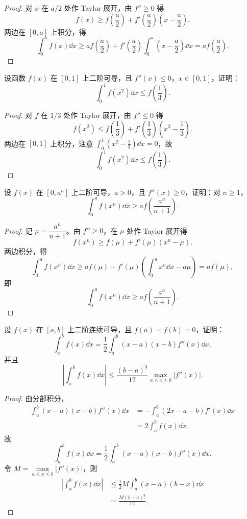 \begin{proof}
	对 $x$ 在 $a/2$ 处作 Taylor 展开，由 $f''\geqslant0$ 得
	\[
	f(x)\geqslant f\left(\frac a2\right)+f'\left(\frac a2\right)\left(x-\frac a2\right).
	\]
	两边在 $[0,a]$ 上积分，得
	\[
	\int_0^a f(x)\dd x
	\geqslant a f\left(\frac a2\right)+f'\left(\frac a2\right)\int_0^a\left(x-\frac a2\right)\dd x
	=a f\left(\frac a2\right).
	\]
\end{proof}

\begin{problem}
	设函数 $f(x)$ 在 $[0,1]$ 上二阶可导，且 $f''(x)\leqslant0$，$x\in[0,1]$，证明：
	\[
	\int_0^1 f(x^2)\dd x\leqslant f\left(\frac13\right).
	\]
\end{problem}

\begin{proof}
	对 $f$ 在 $1/3$ 处作 Taylor 展开，由 $f''\leqslant0$ 得
	\[
	f(x^2)\leqslant f\left(\frac13\right)+f'\left(\frac13\right)\left(x^2-\frac13\right).
	\]
	两边在 $[0,1]$ 上积分，注意 $\displaystyle\int_0^1\left(x^2-\frac13\right)\dd x=0$，故
	\[
	\int_0^1 f(x^2)\dd x\leqslant f\left(\frac13\right).
	\]
\end{proof}

\begin{problem}
	设 $f(x)$ 在 $[0,a^n]$ 上二阶可导，$a>0$，且 $f''(x)\geqslant0$，证明：对 $n\geqslant1$，
	\[
	\int_0^a f(x^n)\dd x\geqslant a f\left(\frac{a^n}{n+1}\right).
	\]
\end{problem}

\begin{proof}
	记 $\mu=\dfrac{a^n}{n+1}$。由 $f''\geqslant0$，在 $\mu$ 处作 Taylor 展开得
	\[
	f(x^n)\geqslant f(\mu)+f'(\mu)(x^n-\mu).
	\]
	两边积分，得
	\[
	\int_0^a f(x^n)\dd x
	\geqslant af(\mu)+f'(\mu)\left(\int_0^a x^n\dd x-a\mu\right)
	=af(\mu),
	\]
	即
	\[
	\int_0^a f(x^n)\dd x\geqslant a f\left(\frac{a^n}{n+1}\right).
	\]
\end{proof}

\begin{problem}
	设 $f(x)$ 在 $[a,b]$ 上二阶连续可导，且 $f(a)=f(b)=0$，证明：
	\[
	\int_a^b f(x)\dd x=\frac12\int_a^b (x-a)(x-b)f''(x)\dd x,
	\]
	并且
	\[
	\left|\int_a^b f(x)\dd x\right|
	\leqslant \frac{(b-a)^3}{12}\max_{a\leqslant x\leqslant b}|f''(x)|.
	\]
\end{problem}

\begin{proof}
	由分部积分，
	\[
	\begin{aligned}
		\int_a^b (x-a)(x-b)f''(x)\dd x
		&=-\int_a^b (2x-a-b)f'(x)\dd x\\
		&=2\int_a^b f(x)\dd x.
	\end{aligned}
	\]
	故
	\[
	\int_a^b f(x)\dd x=\frac12\int_a^b (x-a)(x-b)f''(x)\dd x.
	\]
	令 $M=\max\limits_{a\leqslant x\leqslant b}|f''(x)|$，则
	\[
	\begin{aligned}
		\left|\int_a^b f(x)\dd x\right|
		&\leqslant \frac12 M\int_a^b (x-a)(b-x)\dd x\\
		&=\frac{M(b-a)^3}{12}.
	\end{aligned}
	\]
\end{proof}


